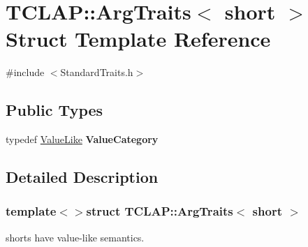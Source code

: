 \hypertarget{struct_t_c_l_a_p_1_1_arg_traits_3_01short_01_4}{\section{T\+C\+L\+A\+P\+:\+:Arg\+Traits$<$ short $>$ Struct Template Reference}
\label{struct_t_c_l_a_p_1_1_arg_traits_3_01short_01_4}
}


{\ttfamily \#include $<$Standard\+Traits.\+h$>$}

\subsection*{Public Types}
\begin{DoxyCompactItemize}
\item 
\hypertarget{struct_t_c_l_a_p_1_1_arg_traits_3_01short_01_4_a99f5d76501b120d6455b528aa7bf6896}{typedef \hyperlink{struct_t_c_l_a_p_1_1_value_like}{Value\+Like} {\bfseries Value\+Category}}\label{struct_t_c_l_a_p_1_1_arg_traits_3_01short_01_4_a99f5d76501b120d6455b528aa7bf6896}

\end{DoxyCompactItemize}


\subsection{Detailed Description}
\subsubsection*{template$<$$>$struct T\+C\+L\+A\+P\+::\+Arg\+Traits$<$ short $>$}

shorts have value-\/like semantics. 